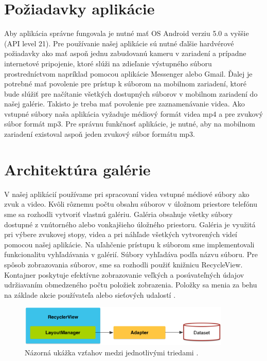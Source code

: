 \documentclass[12pt, oneside]{book}
\begin{document}
\section{Požiadavky aplikácie}

\hspace{15pt} Aby aplikácia správne fungovala je nutné mať OS Android verziu 5.0 a vyššie (API level 21). Pre používanie našej aplikácie sú nutné ďalšie hardvérové požiadavky ako mať aspoň jednu zabudovanú kameru v zariadení a prípadne internetové pripojenie, ktoré slúži na zdieľanie výstupného súboru prostredníctvom napríklad pomocou aplikácie Messenger alebo Gmail. Ďalej je potrebné mať povolenie pre prístup k súborom na mobilnom zariadení, ktoré bude slúžiť pre načítanie všetkých dostupných súborov v mobilnom zariadení do našej galérie. Takisto je treba mať povolenie pre zaznamenávanie videa. Ako vstupné súbory naša aplikácia vyžaduje médiový formát videa mp4 a pre zvukový súbor formát mp3. Pre správnu funkčnosť aplikácie, je nutné, aby na mobilnom zariadení existoval aspoň jeden zvukový súbor formátu mp3.  

\section{Architektúra galérie}
\label{sec:gallery}


\hspace{15pt} V našej aplikácií používame pri spracovaní videa vstupné médiové súbory ako zvuk a video. Kvôli rôznemu počtu obsahu súborov v úložnom priestore telefónu sme sa rozhodli vytvoriť vlastnú galériu. Galéria obsahuje všetky súbory dostupné z vnútorného alebo vonkajšieho úložného priestoru. Galéria je využitá pri výbere zvukovej stopy, videa a pri náhľade všetkých vytvorených videí pomocou našej aplikácie. Na uľahčenie prístupu k súborom sme implementovali funkcionalitu vyhľadávania v galérií. Súbory vyhľadáva podľa názvu súboru. 
\hspace{15pt} Pre spôsob zobrazovania súborov, sme sa rozhodli použiť knižnicu RecycleView. Kontajner poskytuje efektívne zobrazovanie veľkých a posúvateľných údajov udržiavaním obmedzeného počtu položiek zobrazenia. Položky sa menia za behu na základe akcie používateľa alebo sieťových udalostí \cite{recycleView2}.

\begin{figure}[h]
    \centering
    \includegraphics[width=0.9\textwidth]{images/RecyclerView.png}
    \caption{Názorná ukážka vzťahov medzi jednotlivými triedami \cite{recycleView}. }
    \label{fig:obr05}
\end{figure}
\end{document}
